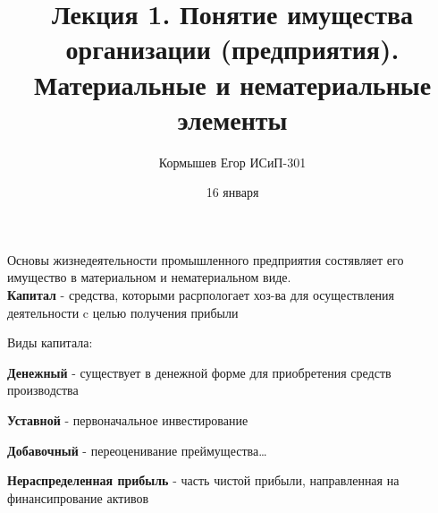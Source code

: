 \documentclass[11pt]{article}
\author{Кормышев Егор ИСиП-301}
\date{16 января}
\title{Лекция 1. Понятие имущества организации (предприятия). Материальные и нематериальные элементы}
\begin{document}
\maketitle
\tableofcontents

Основы жизнедеятельности промышленного предприятия  состявляет его имущество в материальном и нематериальном виде. \\

\textbf{Капитал} -  средства, которыми расрпологает хоз-ва для осуществления деятельности c целью получения прибыли        

\begin{center}
Виды капитала:
\end{center}

\textbf{Денежный} - существует в денежной форме для приобретения средств производства

\textbf{Уставной} - первоначальное инвестирование

\textbf{Добавочный} - переоценивание преймущества\ldots{}

\textbf{Нераспределенная прибыль} - часть чистой прибыли, направленная на финансипрование активов 
\end{document}
